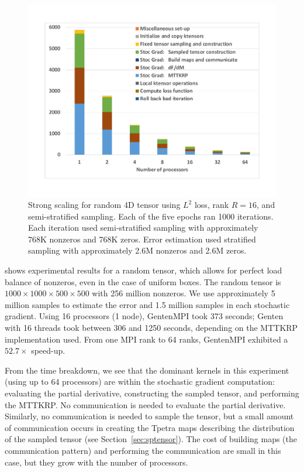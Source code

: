 \begin{figure}
\centering
\includegraphics[keepaspectratio=true, width=4.5in]{figs/strongRandomStacked}
\caption[Strong scaling of GCP-SGD for random order-4 tensor]{Strong scaling for random 4D tensor using $L^2$ loss, rank $R=16$, and semi-stratified sampling.  
Each of the five epochs ran 1000 iterations.  
Each iteration used semi-stratified sampling with approximately 768K nonzeros and 768K zeros. 
Error estimation used stratified sampling with approximately 2.6M nonzeros and 2.6M zeros. 
}
\label{fig:random_scaling}
\end{figure}

 shows experimental results for a random tensor, which allows for perfect load balance of nonzeros, even in the case of uniform boxes.
The random tensor is $1000\times 1000\times 500\times 500$ with 256 million nonzeros.
We use approximately 5 million samples to estimate the error and 1.5 million samples in each stochastic gradient.
Using 16 processors (1 node), GentenMPI took 373 seconds; Genten~\cite{PK19} with 16 threads took between 306 and 1250 seconds, depending on the MTTKRP implementation used.
From one MPI rank to 64 ranks, GentenMPI exhibited a $52.7\times$ speed-up.

From the time breakdown, we see that the dominant kernels in this experiment (using up to 64 processors) are within the stochastic gradient computation: evaluating the partial derivative, constructing the sampled tensor, and performing the MTTKRP.
No communication is needed to evaluate the partial derivative.  Similarly, no communication
is needed to sample the tensor, but a small amount of communication occurs in creating the
Tpetra maps describing the distribution of the sampled tensor 
(see Section~\ref{sec:sptensor}).  
The cost of building maps (the communication pattern) and performing the communication are small in this case, but they grow with the number of processors.

